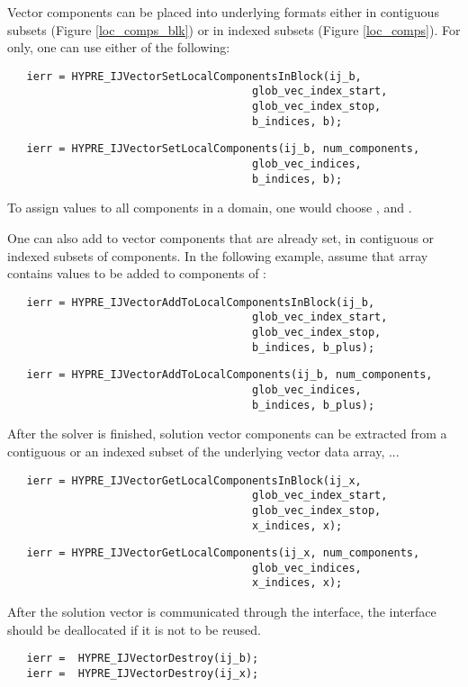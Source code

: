 \noindent Vector components can be placed into
underlying \hypre{} formats either in contiguous subsets (Figure
\ref{loc_comps_blk}) or in indexed subsets (Figure
\ref{loc_comps}). For  only, one can use either of the
following:

\begin{verbatim}
   ierr = HYPRE_IJVectorSetLocalComponentsInBlock(ij_b,
                                      glob_vec_index_start,
                                      glob_vec_index_stop,
                                      b_indices, b);
\end{verbatim}
\begin{verbatim}
   ierr = HYPRE_IJVectorSetLocalComponents(ij_b, num_components,
                                      glob_vec_indices,
                                      b_indices, b);
\end{verbatim}

\noindent To assign values to all components in a domain, one would
choose  \code{=} ,
and  \code{=}.

One can also add to vector components that are already set, in
contiguous or indexed subsets of components.
In the following example,
assume that array 
contains values to be added to components of :

\begin{verbatim}
   ierr = HYPRE_IJVectorAddToLocalComponentsInBlock(ij_b,
                                      glob_vec_index_start,
                                      glob_vec_index_stop,
                                      b_indices, b_plus); 
\end{verbatim}
\begin{verbatim}
   ierr = HYPRE_IJVectorAddToLocalComponents(ij_b, num_components,
                                      glob_vec_indices,
                                      b_indices, b_plus);
\end{verbatim}

\noindent After the solver is finished, solution vector components
can be extracted from a contiguous or an indexed subset of
the underlying vector data array, ...

\begin{verbatim}
   ierr = HYPRE_IJVectorGetLocalComponentsInBlock(ij_x,
                                      glob_vec_index_start,
                                      glob_vec_index_stop,
                                      x_indices, x);
\end{verbatim}
\begin{verbatim}
   ierr = HYPRE_IJVectorGetLocalComponents(ij_x, num_components,
                                      glob_vec_indices,
                                      x_indices, x);
\end{verbatim}

\noindent After the solution vector is communicated through the interface,
the interface should be deallocated if it is not to be reused.

\begin{verbatim}
   ierr =  HYPRE_IJVectorDestroy(ij_b);
   ierr =  HYPRE_IJVectorDestroy(ij_x);
\end{verbatim}



